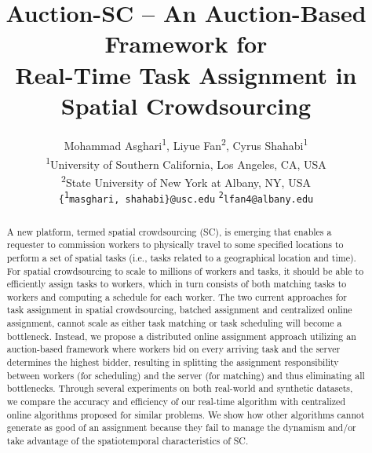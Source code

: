 \documentclass{sig-alternate}
\title{Auction-SC -- An Auction-Based Framework for\\ Real-Time Task Assignment in Spatial Crowdsourcing}
\newcommand*{\myaffaddr}[1]{#1} %
\newcommand*{\myaffmark}[1][*]{\textsuperscript{#1}}
\newcommand*{\myemail}[1]{\texttt{#1}}
\begin{document}
\sloppy

\author{{Mohammad Asghari\myaffmark[1], Liyue Fan\myaffmark[2], Cyrus Shahabi\myaffmark[1]}\\
\myaffaddr{\myaffmark[1]University of Southern California, Los Angeles, CA, USA}\\
\myaffaddr{\myaffmark[2]State University of New York at Albany, NY, USA}\\
\myemail{\{\myaffmark[1]masghari, shahabi\}@usc.edu}    \myemail{\myaffmark[2]lfan4@albany.edu}\\
}



\maketitle

\begin{abstract}
A new platform, termed spatial crowdsourcing (SC), is emerging that enables a requester to commission workers to physically travel to some specified locations to perform a set of spatial tasks (i.e., tasks related to a geographical location and time). For spatial crowdsourcing to scale to millions of workers and tasks, it should be able to efficiently assign tasks to workers, which in turn consists of both matching tasks to workers and computing a schedule for each worker. The two current approaches for task assignment in spatial crowdsourcing, batched assignment and centralized online assignment, cannot scale as either task matching or task scheduling will become a bottleneck.  Instead, we propose a distributed online assignment approach utilizing an auction-based framework where workers bid on every arriving task and the server determines the highest bidder, resulting in splitting the assignment responsibility between workers (for scheduling) and the server (for matching) and thus eliminating all bottlenecks. Through several experiments on both real-world and synthetic datasets, we compare the accuracy and efficiency of our real-time algorithm with centralized online algorithms proposed for similar problems. We show how other algorithms cannot generate as good of an assignment because they fail to manage the dynamism and/or take advantage of the spatiotemporal characteristics of SC.

\end{abstract}







%







\begin{scriptsize}


\end{scriptsize}

%
\end{document}
